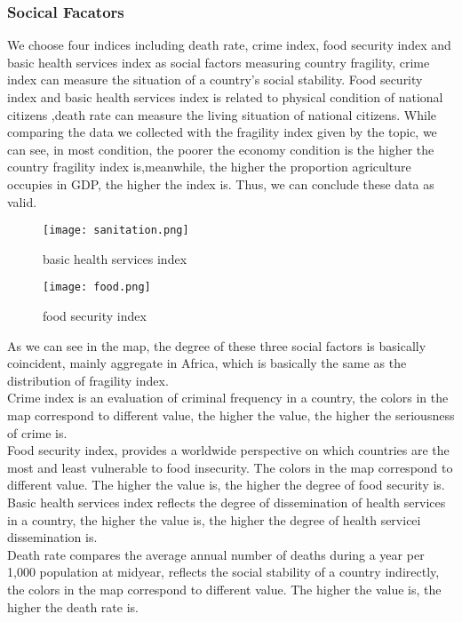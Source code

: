 \documentclass{mcmthesis}
\begin{document}
\subsubsection{Socical Facators}
We choose four indices including death rate, crime index, food security index and basic health services index as social factors measuring country fragility, crime index can measure the situation of a country's social stability. Food security index and basic health services index is related to physical condition of national citizens ,death rate can measure the living situation of national citizens. While comparing the data we collected with the fragility index given by the topic, we can see, in most condition, the poorer the economy condition is the higher the country fragility index is,meanwhile, the higher the proportion agriculture occupies in GDP, the higher the index is. Thus, we can conclude these data as valid.\\
\begin{figure}[h]
  \centering
  \begin{minipage}[h]{0.48\textwidth}
  \centering
  \texttt{[image: sanitation.png]}
  \caption{basic health services index}
  \end{minipage}
  \begin{minipage}[h]{0.48\textwidth}
  \centering
  \texttt{[image: food.png]}
  \caption{food security index}
  \end{minipage}
\end{figure}
As we can see in the map, the degree of these three social factors is basically coincident, mainly aggregate in Africa, which is basically the same as the distribution of fragility index.\\
Crime index is an evaluation of criminal frequency in a country, the colors in the map correspond to different value, the higher the value, the higher the seriousness of crime is.\\
Food security index, provides a worldwide perspective on which countries are the most and least vulnerable to food insecurity. The colors in the map correspond to different value. The higher the value is, the higher the degree of food security is.\\
Basic health services index reflects the degree of dissemination of health services in a country, the higher the value is, the higher the degree of health servicei dissemination is.\\
Death rate compares the average annual number of deaths during a year per 1,000 population at midyear, reflects the social stability of a country indirectly, the colors in the map correspond to different value. The higher the value is, the higher the death rate is.
\end{document}
